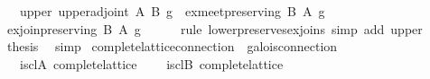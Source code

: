 \begin{isabellebody}
\ \ \ upper{}\ {}upper{}adjoint\ A\ B\ g{}\ \ {}ex{}meet{}preserving\ B\ A\ g{}\isanewline
%
\isadelimproof
%
\endisadelimproof
%
\isatagproof
{}\isamarkupfalse%
\ {}\isanewline
\ \ \isamarkupfalse%
\ {}ex{}join{}preserving\ {}B{}{}\ {}A{}{}\ g{}\isanewline
\ \ \ \ \isamarkupfalse%
\ {}rule\ lower{}preserves{}ex{}joins{}\ simp\ add{}\ upper{}\isanewline
\isanewline
\ \ \isamarkupfalse%
\ {}thesis\ \isamarkupfalse%
\ simp\isanewline
{}\isamarkupfalse%
%
\endisatagproof
{\isafoldproof}%
%
\isadelimproof
\isanewline
%
\endisadelimproof
\isanewline
\isanewline
\isanewline
{}\isamarkupfalse%
\ complete{}lattice{}connection\ {}\ galois{}connection\ {}\isanewline
\ \ \ is{}cl{}A{}\ {}complete{}lattice\ {}{}\isanewline
\ \ \ is{}cl{}B{}\ {}complete{}lattice\ {}{}\isanewline

\end{isabellebody}
